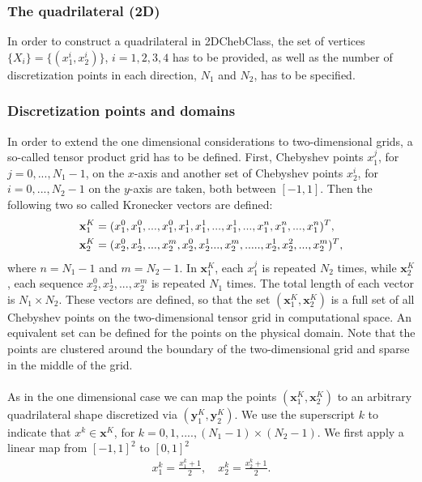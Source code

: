 \subsubsection{The quadrilateral (2D)}
In order to construct a quadrilateral in 2DChebClass, the set of vertices $\{X_i\} = \{(x_1^i,x_2^i)\}$, $i = 1,2,3,4$ has to be provided, as well as the number of discretization points in each direction, $N_1$ and $N_2$, has to be specified.
\subsubsection*{Discretization points and domains}
In order to extend the one dimensional considerations to two-dimensional grids, a so-called tensor product grid has to be defined. First, Chebyshev points $x_1^j$, for $j=0,...,N_1-1$, on the $x$-axis and another set of Chebyshev points $x_2^i$, for $i=0,...,N_2-1$ on the $y$-axis are taken, both between $[-1,1]$. 
Then the following two so called Kronecker vectors are defined:
\begin{align}\label{eq:KroneckerVec}
	\mathbf{x}_1^{K}&=(x_1^0,x_1^0,...,x_1^0,x_1^1,x_1^1,...,x_1^1,...,x_1^n,x_1^n,...,x_1^n)^T,\\
	\mathbf{x}_2^{K}&=(x_2^0,x_2^1,...,x_2^m,x_2^0,x_2^1...,x_2^m,.....,x_2^1,x_2^2,...,x_2^m)^T,\notag
\end{align} 
where $n = N_1 - 1$ and $m = N_2 -1$.
In $\mathbf{x}_1^{K}$, each $x_1^j$ is repeated $N_2$ times, while $\mathbf{x}_2^{K}$, each sequence $x_2^0,x_2^1,...,x_2^m$ is repeated $N_1$ times. The total length of each vector is $N_1 \times N_2$. 
These vectors are defined, so that the set $(\mathbf{x}_1^{K},\mathbf{x}_2^{K})$ is a full set of all Chebyshev points on the two-dimensional tensor grid in computational space. An equivalent set can be defined for the points on the physical domain. Note that the points are clustered around the boundary of the two-dimensional grid and sparse in the middle of the grid.
\\
\\
As in the one dimensional case we can map the points $(\mathbf{x}_1^{K},\mathbf{x}_2^{K})$ to an arbitrary quadrilateral shape discretized via $(\mathbf{y}_1^{K},\mathbf{y}_2^{K})$. We use the superscript $k$ to indicate that $x^k \in \mathbf{x}^{K}$, for $k = 0,1,....,(N_1 - 1)\times (N_2 - 1)$. We first apply a linear map from $[-1,1]^2$ to $[0,1]^2$ 
\begin{align*}
	x_1^k = \frac{x_1^k+1}{2}, \quad
	x_2^k = \frac{x_2^k+1}{2}.
\end{align*}
